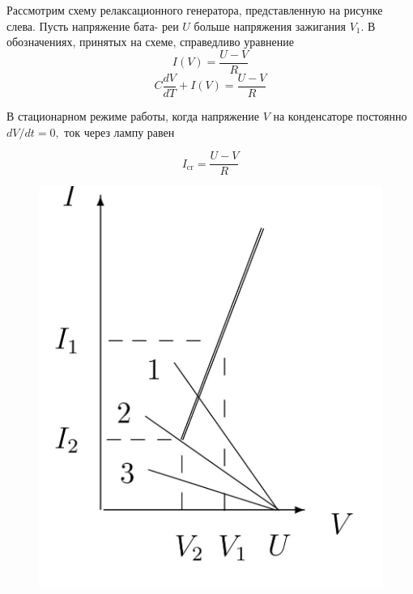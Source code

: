 \documentclass[a4paper,12pt]{article} %
\begin{document}
Рассмотрим схему релаксационного генератора, представленную на рисунке слева. Пусть напряжение бата- реи $U$ больше напряжения зажигания $V_{1} .$ В обозначениях, принятых на схеме, справедливо уравнение
\begin{equation*}
I(V)=\frac{U-V}{R}
\end{equation*}
\begin{equation}
C \frac{d V}{d T}+I(V)=\frac{U-V}{R}
\end{equation}


В стационарном режиме работы, когда напряжение $V$ на конденсаторе постоянно $d V / d t=0,$ ток через лампу равен

\begin{equation}
    I_{\mathrm{cr}}=\frac{U-V}{R}
\end{equation}

\begin{figure} 
\begin{center}
\includegraphics[width=1\textwidth]{graph2.jpg}
\caption{}
\end{center}
\end{figure}
\end{document}
